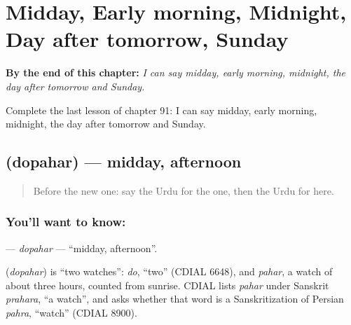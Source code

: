 
\chapter{Midday, Early morning, Midnight, Day after tomorrow, Sunday}
\label{ch:ur-midday-early-morning-midnight-day-after-tomorrow-sunday}

\begin{chapteropening}
\textbf{By the end of this chapter:} \emph{I can say midday, early morning, midnight, the day after tomorrow and Sunday.}

Complete the last lesson of chapter 91: I can say midday, early morning, midnight, the day after tomorrow and Sunday.
\end{chapteropening}

\section[\texorpdfstring{\ur{دوپہر} (dopahar)}{دوپہر (dopahar)}]{ (dopahar) — midday, afternoon}

\label{lesson:UR-C91-dopahar}



\begin{quote}
Before the new one: say the Urdu for the one, then the Urdu for here.
\end{quote}

\subsection*{You'll want to know: }
\textbf{} — \emph{dopahar} — \textquotedblleft{}midday, afternoon\textquotedblright{}.

\begin{cousinweb}
\textbf{} (\emph{dopahar}) is \textquotedblleft{}two watches\textquotedblright{}: \emph{do}, \textquotedblleft{}two\textquotedblright{} (CDIAL 6648), and \emph{pahar}, a watch of about three hours, counted from sunrise. CDIAL lists \emph{pahar} under Sanskrit \emph{prahara}, \textquotedblleft{}a watch\textquotedblright{}, and asks whether that word is a Sanskritization of Persian \emph{pahra}, \textquotedblleft{}watch\textquotedblright{} (CDIAL 8900).
\end{cousinweb}


